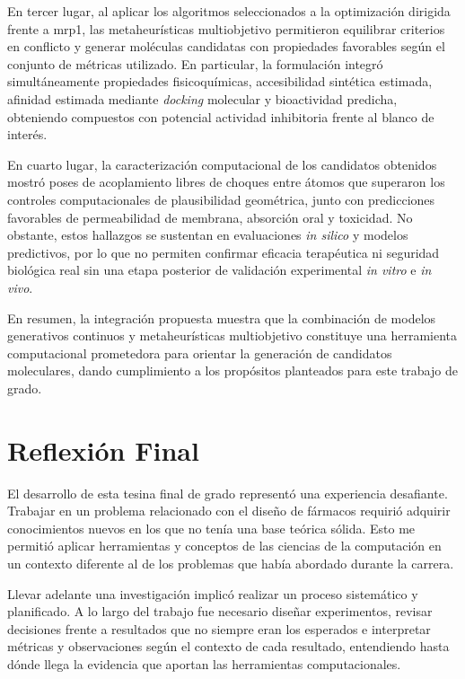 En tercer lugar, al aplicar los algoritmos seleccionados a la optimización dirigida frente a \gls{mrp1}, las metaheurísticas multiobjetivo permitieron equilibrar criterios en conflicto y generar moléculas candidatas con propiedades favorables según el conjunto de métricas utilizado. En particular, la formulación integró simultáneamente propiedades fisicoquímicas, accesibilidad sintética estimada, afinidad estimada mediante \textit{docking} molecular y bioactividad predicha, obteniendo compuestos con potencial actividad inhibitoria frente al blanco de interés.

En cuarto lugar, la caracterización computacional de los candidatos obtenidos mostró poses de acoplamiento libres de choques entre átomos que superaron los controles computacionales de plausibilidad geométrica, junto con predicciones favorables de permeabilidad de membrana, absorción oral y toxicidad. No obstante, estos hallazgos se sustentan en evaluaciones \textit{in silico} y modelos predictivos, por lo que no permiten confirmar eficacia terapéutica ni seguridad biológica real sin una etapa posterior de validación experimental \textit{in vitro} e \textit{in vivo}.

En resumen, la integración propuesta muestra que la combinación de modelos generativos continuos y metaheurísticas multiobjetivo constituye una herramienta computacional prometedora para orientar la generación de candidatos moleculares, dando cumplimiento a los propósitos planteados para este trabajo de grado.

\section{Reflexión Final}
\label{sec:reflexion_final}

El desarrollo de esta tesina final de grado representó una experiencia desafiante. Trabajar en un problema relacionado con el diseño de fármacos requirió adquirir conocimientos nuevos en los que no tenía una base teórica sólida. Esto me permitió aplicar herramientas y conceptos de las ciencias de la computación en un contexto diferente al de los problemas que había abordado durante la carrera.

Llevar adelante una investigación implicó realizar un proceso sistemático y planificado. A lo largo del trabajo fue necesario diseñar experimentos, revisar decisiones frente a resultados que no siempre eran los esperados e interpretar métricas y observaciones según el contexto de cada resultado, entendiendo hasta dónde llega la evidencia que aportan las herramientas computacionales.

